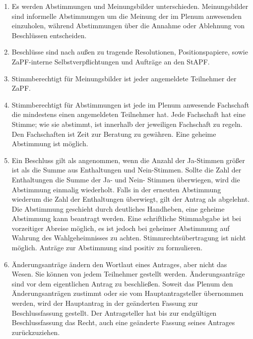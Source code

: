 \documentclass[draft,12pt,oneside]{scrreprt}
\begin{document}
\begin{enumerate}
  \item Es werden Abstimmungen und Meinungsbilder unterschieden. Meinungsbilder
        sind informelle Abstimmungen um die Meinung der im Plenum anwesenden
        einzuholen, während Abstimmungen über die Annahme oder Ablehnung von
        Beschlüssen entscheiden.

  \item Beschlüsse sind nach außen zu tragende Resolutionen, Positionspapiere,
        sowie ZaPF-interne Selbstverpflichtungen und Aufträge an den StAPF.

  \item Stimmberechtigt für Meinungsbilder ist jeder angemeldete Teilnehmer der
        ZaPF.

  \item Stimmberechtigt für Abstimmungen ist jede im Plenum anwesende Fachschaft
        die mindestens einen angemeldeten Teilnehmer hat.\label{it:stimmberechtigtabstimmungen}
        Jede Fachschaft hat eine Stimme; wie sie abstimmt, ist innerhalb der
        jeweiligen Fachschaft zu regeln.
        Den Fachschaften ist Zeit zur Beratung zu gewähren.
        Eine geheime Abstimmung ist möglich.

  \item Ein Beschluss gilt als angenommen, wenn die Anzahl der Ja-Stimmen größer
        ist als die Summe aus Enthaltungen und Nein-Stimmen.
        Sollte die Zahl der Enthaltungen die Summe der Ja- und Nein- Stimmen
        überwiegen, wird die Abstimmung einmalig wiederholt.
        Falls in der erneuten Abstimmung wiederum die Zahl der Enthaltungen
        überwiegt, gilt der Antrag als abgelehnt.
        Die Abstimmung geschieht durch deutliches Handheben, eine geheime
        Abstimmung kann beantragt werden.
        Eine schriftliche Stimmabgabe ist bei vorzeitiger Abreise möglich, es ist
        jedoch bei geheimer Abstimmung auf Wahrung des Wahlgeheimnisses zu achten.
        Stimmrechtsübertragung ist nicht möglich.
        Anträge zur Abstimmung sind positiv zu formulieren.

  \item Änderungsanträge ändern den Wortlaut eines Antrages, aber nicht das Wesen.
        Sie können von jedem Teilnehmer gestellt werden.
        Änderungsanträge sind vor dem eigentlichen Antrag zu beschließen.
        Soweit das Plenum den Änderungsanträgen zustimmt oder sie vom
        Hauptantragsteller übernommen werden, wird der Hauptantrag in der
        geänderten Fassung zur Beschlussfassung gestellt.
        Der Antragsteller hat bis zur endgültigen Beschlussfassung das Recht,
        auch eine geänderte Fassung seines Antrages zurückzuziehen.


\end{enumerate}
\end{document}
